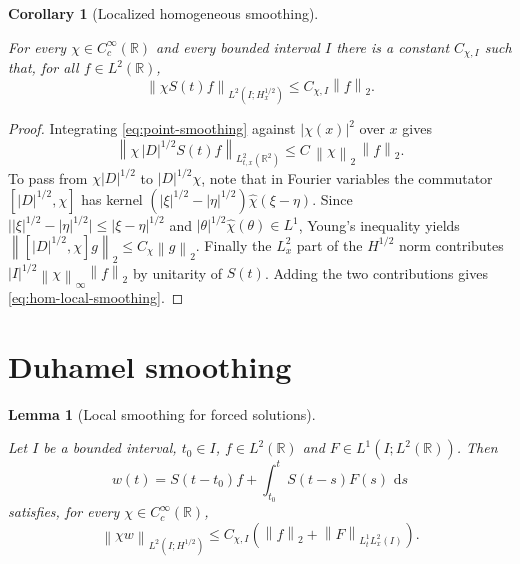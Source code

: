 \documentclass[11pt,oneside]{book}
\providecommand{\uses}[1]{}
\newtheorem{lemma}[theorem]{Lemma}
\newtheorem{corollary}[theorem]{Corollary}
\theoremstyle{definition}
\theoremstyle{remark}
\newcommand{\R}{\mathbb R}
\newcommand{\1}{\mathbf 1}
\newcommand{\dd}{\,\mathrm d}
\newcommand{\norm}[1]{\left\lVert #1\right\rVert}
\begin{document}
\begin{corollary}[Localized homogeneous smoothing]\label{cor:hom-smoothing}
\uses{lem:point-smoothing, def:propagator, def:Hs-space, def:scalar-mixed-norm}
For every $\chi\in C_c^\infty(\R)$ and every bounded interval $I$ there is a
constant $C_{\chi,I}$ such that, for all $f\in L^2(\R)$,
\begin{equation}
 \norm{\chi S(t)f}_{L^2(I;H^{1/2}_x)}
 \le C_{\chi,I}\norm f_2 .
 \label{eq:hom-local-smoothing}
\end{equation}
\end{corollary}

\begin{proof}
\uses{lem:point-smoothing}
Integrating \eqref{eq:point-smoothing} against $|\chi(x)|^2$ over $x$ gives
\[
 \norm{\chi\,|D|^{1/2}S(t)f}_{L^2_{t,x}(\R^2)}
 \le C\,\norm\chi_2\,\norm f_2 .
\]
To pass from $\chi|D|^{1/2}$ to $|D|^{1/2}\chi$, note that in Fourier variables
the commutator $[|D|^{1/2},\chi]$ has kernel
$(|\xi|^{1/2}-|\eta|^{1/2})\widehat\chi(\xi-\eta)$. Since
$\big||\xi|^{1/2}-|\eta|^{1/2}\big|\le|\xi-\eta|^{1/2}$ and
$|\theta|^{1/2}\widehat\chi(\theta)\in L^1$, Young's inequality yields
$\norm{[|D|^{1/2},\chi]g}_2\le C_\chi\norm g_2$. Finally the $L^2_x$ part of the
$H^{1/2}$ norm contributes $|I|^{1/2}\norm\chi_\infty\norm f_2$ by unitarity of
$S(t)$. Adding the two contributions gives \eqref{eq:hom-local-smoothing}.
\end{proof}

\section{Duhamel smoothing}

\begin{lemma}[Local smoothing for forced solutions]\label{lem:Duhamel-smoothing}
\uses{cor:hom-smoothing, thm:inhom-str, def:propagator, def:Hs-space, def:scalar-mixed-norm}
Let $I$ be a bounded interval, $t_0\in I$, $f\in L^2(\R)$ and
$F\in L^1(I;L^2(\R))$. Then
\[
 w(t)=S(t-t_0)f+\int_{t_0}^tS(t-s)F(s)\,\dd s
\]
satisfies, for every $\chi\in C_c^\infty(\R)$,
\begin{equation}
 \norm{\chi w}_{L^2(I;H^{1/2})}
 \le C_{\chi,I}\left(\norm f_2+\norm F_{L^1_tL^2_x(I)}\right).
 \label{eq:forced-smoothing}
\end{equation}
\end{lemma}
\end{document}
